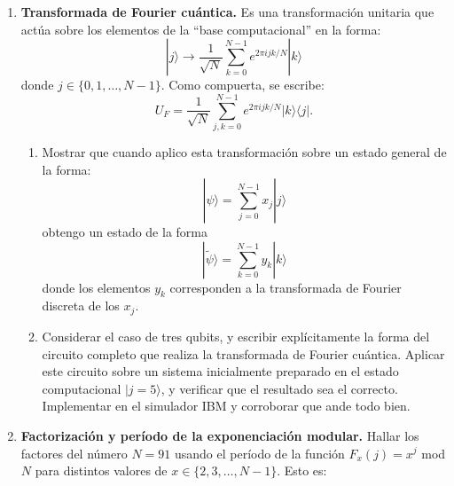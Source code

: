 \documentclass[a4paper,11pt,spanish]{article}
\newcommand{\ket}[1]{|#1\rangle}
\newcommand{\bra}[1]{\langle #1|}
\newcommand{\ketbra}[2]{\ket{#1}\bra{#2}}
\begin{document}
\begin{enumerate}
 \begin{enumerate}
   \item Considerar el caso $N=20$, y dos secuencias dada por $x_j=e^{-2\pi i m j/N}$, con $j=0,1,\ldots,N-1$, y tomando los casos $m=1$ y $m=5$. Graficar las secuencias, ya sea descomponiendo $x_j$ en sus partes reales e imaginarias o marcando los sucesivos puntos sobre el plano complejo. Calcular las transformadas de Fourier de cada secuencia e interpretar el resultado.

   \item Verificar (para el caso general) que la inversa de la transformada de Fourier se obtiene cambiando $i$ por $-i$ en la transformaci\'on, es decir que vale:
   $$x_l = \frac{1}{\sqrt{N}} \sum_{k=0}^{N-1} y_k e^{-2\pi i lk/N}$$   
 \end{enumerate}
 
 \item {\bf Transformada de Fourier cu\'antica.} Es una transformaci\'on unitaria que act\'ua sobre los elementos de la ``base computacional'' en la forma:
 $$\ket{j} \to \frac{1}{\sqrt{N}} \sum_{k=0}^{N-1} e^{2\pi i jk/N} \ket{k}$$
 donde $j\in\{0,1,\ldots,N-1\}$. Como compuerta, se escribe:
 $$U_F =\frac{1}{\sqrt{N}} \sum_{j,k=0}^{N-1} e^{2\pi i jk/N} \ketbra{k}{j}.$$

 
 \begin{enumerate}
  \item Mostrar que cuando aplico esta transformaci\'on sobre un estado general de la forma:
 $$ \ket{\psi} = \sum_{j=0}^{N-1} x_j \ket{j}$$
 obtengo un estado de la forma
 $$ \ket{\tilde\psi} = \sum_{k=0}^{N-1} y_k \ket{k}$$
 donde los elementos $y_k$ corresponden a la transformada de Fourier discreta de los $x_j$.
 
\item Considerar el caso de tres qubits, y escribir expl\'icitamente la forma del circuito completo que realiza la transformada de Fourier cu\'antica. Aplicar este circuito sobre un sistema inicialmente preparado en el estado computacional $\ket{j=5}$, y verificar que el resultado sea el correcto. Implementar en el simulador IBM y corroborar que ande todo bien.

 \end{enumerate}
 
 \item {\bf Factorizaci\'on y per\'iodo de la exponenciaci\'on modular.} Hallar los factores del n\'umero $N=91$ usando el per\'iodo de la funci\'on $F_x(j)=x^j$ mod $N$ para distintos valores de $x\in \{2,3,\ldots,N-1\}$. Esto es:


\end{enumerate}
\end{document}
